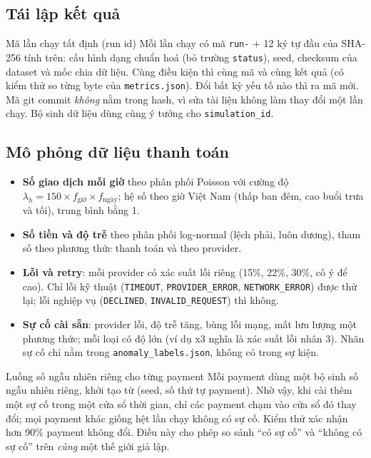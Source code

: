 \documentclass[11pt,a4paper]{article}
\newcommand{\code}[1]{\texttt{\small #1}}
\begin{document}
\subsection{Tái lập kết quả}

\begin{explain}{Mã lần chạy tất định (run id)}
Mỗi lần chạy có mã \code{run-} + 12 ký tự đầu của SHA-256 tính trên: cấu hình dạng chuẩn hoá (bỏ trường \code{status}), seed, checksum của dataset và mốc chia dữ liệu. Cùng điều kiện thì cùng mã và cùng kết quả (có kiểm thử so từng byte của \code{metrics.json}). Đổi bất kỳ yếu tố nào thì ra mã mới. Mã git commit \emph{không} nằm trong hash, vì sửa tài liệu không làm thay đổi một lần chạy. Bộ sinh dữ liệu dùng cùng ý tưởng cho \code{simulation\_id}.
\end{explain}

\subsection{Mô phỏng dữ liệu thanh toán}
\begin{itemize}
  \item \textbf{Số giao dịch mỗi giờ} theo phân phối Poisson với cường độ $\lambda_h=150\times f_{\text{giờ}}\times f_{\text{ngày}}$; hệ số theo giờ Việt Nam (thấp ban đêm, cao buổi trưa và tối), trung bình bằng 1.
  \item \textbf{Số tiền và độ trễ} theo phân phối log-normal (lệch phải, luôn dương), tham số theo phương thức thanh toán và theo provider.
  \item \textbf{Lỗi và retry}: mỗi provider có xác suất lỗi riêng (15\%, 22\%, 30\%, cố ý để cao). Chỉ lỗi kỹ thuật (\code{TIMEOUT}, \code{PROVIDER\_ERROR}, \code{NETWORK\_ERROR}) được thử lại; lỗi nghiệp vụ (\code{DECLINED}, \code{INVALID\_REQUEST}) thì không.
  \item \textbf{Sự cố cài sẵn}: provider lỗi, độ trễ tăng, bùng lỗi mạng, mất lưu lượng một phương thức; mỗi loại có độ lớn (ví dụ x3 nghĩa là xác suất lỗi nhân 3). Nhãn sự cố chỉ nằm trong \code{anomaly\_labels.json}, không có trong sự kiện.
\end{itemize}

\begin{explain}{Luồng số ngẫu nhiên riêng cho từng payment}
Mỗi payment dùng một bộ sinh số ngẫu nhiên riêng, khởi tạo từ (seed, số thứ tự payment). Nhờ vậy, khi cài thêm một sự cố trong một cửa sổ thời gian, chỉ các payment chạm vào cửa sổ đó thay đổi; mọi payment khác giống hệt lần chạy không có sự cố. Kiểm thử xác nhận hơn 90\% payment không đổi. Điều này cho phép so sánh ``có sự cố'' và ``không có sự cố'' trên \emph{cùng} một thế giới giả lập.
\end{explain}
\end{document}
